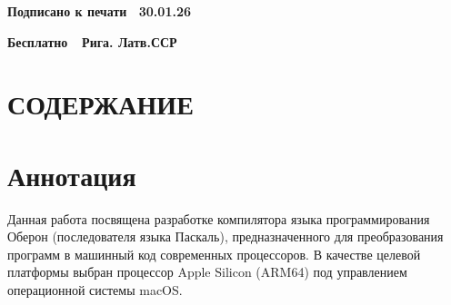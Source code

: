\documentclass[utf8]{lgu}
\begin{document}
{\color{black}\maketitle}
\makeatletter
\renewcommand{\thepage}{\arabic{page}}
\renewcommand{\ps@plain}{%
  \renewcommand{\@oddfoot}{\hfil{\scriptsize\thepage}\hfil}%
  \renewcommand{\@evenfoot}{\hfil{\scriptsize\thepage}\hfil}%
  \renewcommand{\@oddhead}{}%
  \renewcommand{\@evenhead}{}%
}
\pagestyle{plain}
\makeatother
\clearpage

\edef\savedpg{\arabic{page}}%
{\color{black}\maketitle}%
\setcounter{page}{\savedpg}%


\thispagestyle{empty}
\makeatletter
\vspace*{\fill}
\begin{center}%
  \hspace*{-3cm}
  \begin{minipage}{0.6\textwidth}
    \centering
    \scriptsize
    \textbf{Подписано к печати~ 30.01.26}

    \textbf{Бесплатно\;\;\,~ Рига. Латв.\;ССР}
  \end{minipage}
\end{center}
\makeatother
\newpage

\renewcommand{\contentsname}{\uppercase{Содержание}}
\makeatletter
\renewcommand{\tableofcontents}{%
  \section*{\centering\contentsname}%
}
\makeatother
\tableofcontents

\newpage

\section*{Аннотация}
\firstparskip

Данная работа посвящена разработке компилятора языка программирования Оберон (последователя языка Паскаль), предназначенного для преобразования программ в машинный код современных процессоров. В качестве целевой платформы выбран процессор Apple Silicon (ARM64) под управлением операционной системы macOS.
\end{document}
